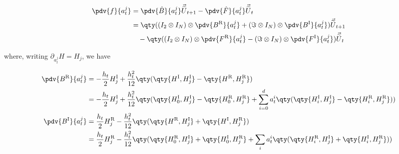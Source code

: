 \documentclass{article}
\newcommand{\isoU}{\widetilde{U}}
\newcommand{\isovecU}{\vec{\widetilde{U}}}
\newcommand{\isovec}{\text{isovec}}
\newcommand{\HI}{H^{\text{I}}}
\newcommand{\HR}{H^{\text{R}}}
\newcommand{\BR}{B^{\text{R}}}
\newcommand{\BI}{B^{\text{I}}}
\newcommand{\FR}{F^{\text{R}}}
\newcommand{\FI}{F^{\text{I}}}
\newcommand{\UR}{U^{\text{R}}}
\newcommand{\UI}{U^{\text{I}}}
\begin{document}
\begin{align*}
  \pdv{f}{a^j_t} %
  &= \pdv{\hat B}{a^j_t} \isovecU_{t+1} - \pdv{\hat F}{a^j_t} \isovecU_{t} \\
  &= \qty((I_2 \otimes I_N) \otimes \pdv{\BR}{a^j_t} + (\Im \otimes I_N) \otimes \pdv{\BI}{a^j_t}) \isovecU_{t+1} \\
  & \quad - \qty((I_2 \otimes I_N) \otimes \pdv{\FR}{a^j_t} - (\Im \otimes I_N) \otimes \pdv{\FI}{a^j_t}) \isovecU_{t} 
\end{align*}

where, writing $\partial_{a^j_t} H = H_j$, we have 

\begin{align*}
  \pdv{\BR}{a^j_t} &= -\frac{h_t}{2} \HI_j + \frac{h_t^2}{12} \qty(\qty{\HI,\HI_j} - \qty{\HR, \HR_j}) \\
  &= -\frac{h_t}{2} \HI_j + \frac{h_t^2}{12} \qty(\qty{\HI_0, \HI_j} - \qty{\HR_0, \HR_j} + \sum_{i=0}^d a^i_t \qty(\qty{\HI_i, \HI_j} - \qty{\HR_i, \HR_j})) \\
  \pdv{\BI}{a^j_t} &= \frac{h_t}{2} \HR_j - \frac{h_t^2}{12} \qty(\qty{\HR,\HI_j} + \qty{\HI,\HR_j}) \\
  &= \frac{h_t}{2} \HR_j - \frac{h_t^2}{12} \qty(\qty{\HR_0,\HI_j} + \qty{\HI_0,\HR_j} + \sum_i a^i_t \qty(\qty{\HR_i,\HI_j} + \qty{\HI_i,\HR_j})) \\
\end{align*}
\end{document}
